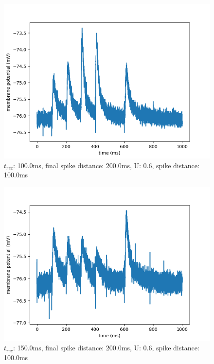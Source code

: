 \documentclass[10pt,a4paper]{scrartcl}
\begin{document}
\begin{figure} [ht]
\begin{center}
\label{fig:abb19}
\caption{$t_{rec}$: 100.0ms, final spike distance: 200.0ms, U: 0.6, spike distance: 100.0ms}
\includegraphics[scale=0.35]{pictures/final_spike_variation_9.pdf} 
\end{center}
\end{figure}

\begin{figure} [ht]
\begin{center}
\label{fig:abb20}
\caption{$t_{rec}$: 150.0ms, final spike distance: 200.0ms, U: 0.6, spike distance: 100.0ms}
\includegraphics[scale=0.35]{pictures/final_spike_variation_10.pdf} 
\end{center}
\end{figure}
\end{document}
